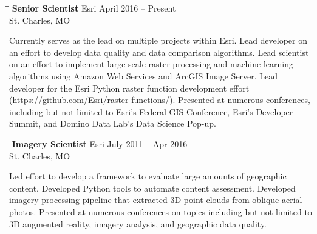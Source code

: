 \documentclass{res}
\begin{document}
\begin{resume}
   \begin{tabbing}
	\hspace{2.3in}\= \hspace{2.6in}\= \kill %
	{\bf Senior Scientist} \>Esri     \>April 2016 -- Present\\
	\>St. Charles, MO
\end{tabbing}\vspace{-20pt}      %
Currently serves as the lead on multiple projects within Esri. Lead developer on an effort to develop data quality and data comparison algorithms. Lead scientist on an effort to implement large scale raster processing and machine learning algorithms using Amazon Web Services and ArcGIS Image Server. Lead developer for the Esri Python raster function development effort (https://github.com/Esri/raster-functions/). Presented at numerous conferences, including but not limited to Esri's Federal GIS Conference, Esri's Developer Summit, and Domino Data Lab's Data Science Pop-up.

   \begin{tabbing}
	\hspace{2.3in}\= \hspace{2.6in}\= \kill %
	{\bf Imagery Scientist} \>Esri     \>July 2011 -- Apr 2016\\
	\>St. Charles, MO
\end{tabbing}\vspace{-20pt}      %
Led effort to develop a framework to evaluate large amounts of geographic content. Developed Python tools to automate content assessment. Developed imagery processing pipeline that extracted 3D point clouds from oblique aerial photos. Presented at numerous conferences on topics including but not limited to 3D augmented reality, imagery analysis, and geographic data quality.


\end{resume}
\end{document}
